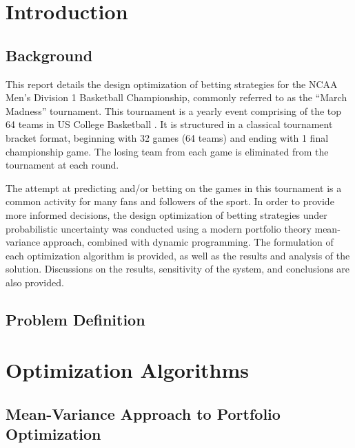 \documentclass[12pt]{article}
\begin{document}


\dotableofcontents

\newpage
\doublespacing
{}
\section{Introduction}
\setlength{\parindent}{1cm}
\subsection{Background}
This report details the design optimization of betting strategies for the NCAA Men's Division 1 Basketball Championship, commonly referred to as the ``March Madness'' tournament.
This tournament is a yearly event comprising of the top 64 teams in US College Basketball \cite{doi:10.1080/00031305.1996.10473540}.
It is structured in a classical tournament bracket format, beginning with 32 games (64 teams) and ending with 1 final championship game.
The losing team from each game is eliminated from the tournament at each round.

The attempt at predicting and/or betting on the games in this tournament is a common activity for many fans and followers of the sport.
In order to provide more informed decisions, the design optimization of betting strategies under probabilistic uncertainty was conducted using a modern portfolio theory mean-variance approach, combined with dynamic programming.
The formulation of each optimization algorithm is provided, as well as the results and analysis of the solution.
Discussions on the results, sensitivity of the system, and conclusions are also provided. 

\subsection{Problem Definition}


\newpage
\section{Optimization Algorithms}
\subsection{Mean-Variance Approach to Portfolio Optimization}
\end{document}
